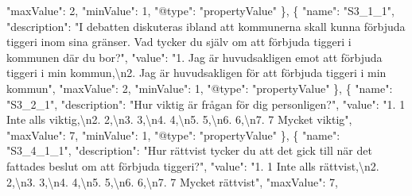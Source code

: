 \documentclass[
]{book}
\newenvironment{Shaded}{\begin{snugshade}}{\end{snugshade}}
\newcommand{\CharTok}[1]{\textcolor[rgb]{0.31,0.60,0.02}{#1}}
\newcommand{\DataTypeTok}[1]{\textcolor[rgb]{0.13,0.29,0.53}{#1}}
\newcommand{\DecValTok}[1]{\textcolor[rgb]{0.00,0.00,0.81}{#1}}
\newcommand{\FunctionTok}[1]{\textcolor[rgb]{0.00,0.00,0.00}{#1}}
\newcommand{\OtherTok}[1]{\textcolor[rgb]{0.56,0.35,0.01}{#1}}
\newcommand{\StringTok}[1]{\textcolor[rgb]{0.31,0.60,0.02}{#1}}
\begin{document}
\begin{Shaded}
\begin{Highlighting}[]
      \DataTypeTok{"maxValue"}\FunctionTok{:} \DecValTok{2}\FunctionTok{,}
      \DataTypeTok{"minValue"}\FunctionTok{:} \DecValTok{1}\FunctionTok{,}
      \DataTypeTok{"@type"}\FunctionTok{:} \StringTok{"propertyValue"}
    \FunctionTok{\}}\OtherTok{,}
    \FunctionTok{\{}
      \DataTypeTok{"name"}\FunctionTok{:} \StringTok{"S3_1_1"}\FunctionTok{,}
      \DataTypeTok{"description"}\FunctionTok{:} \StringTok{"I debatten diskuteras ibland att kommunerna skall kunna förbjuda tiggeri inom sina gränser. Vad tycker du själv om att förbjuda tiggeri i kommunen där du bor?"}\FunctionTok{,}
      \DataTypeTok{"value"}\FunctionTok{:} \StringTok{"1. Jag är huvudsakligen emot att förbjuda tiggeri i min kommun,}\CharTok{\textbackslash{}n}\StringTok{2. Jag är huvudsakligen för att förbjuda tiggeri i min kommun"}\FunctionTok{,}
      \DataTypeTok{"maxValue"}\FunctionTok{:} \DecValTok{2}\FunctionTok{,}
      \DataTypeTok{"minValue"}\FunctionTok{:} \DecValTok{1}\FunctionTok{,}
      \DataTypeTok{"@type"}\FunctionTok{:} \StringTok{"propertyValue"}
    \FunctionTok{\}}\OtherTok{,}
    \FunctionTok{\{}
      \DataTypeTok{"name"}\FunctionTok{:} \StringTok{"S3_2_1"}\FunctionTok{,}
      \DataTypeTok{"description"}\FunctionTok{:} \StringTok{"Hur viktig är frågan för dig personligen?"}\FunctionTok{,}
      \DataTypeTok{"value"}\FunctionTok{:} \StringTok{"1. 1 Inte alls viktig,}\CharTok{\textbackslash{}n}\StringTok{2. 2,}\CharTok{\textbackslash{}n}\StringTok{3. 3,}\CharTok{\textbackslash{}n}\StringTok{4. 4,}\CharTok{\textbackslash{}n}\StringTok{5. 5,}\CharTok{\textbackslash{}n}\StringTok{6. 6,}\CharTok{\textbackslash{}n}\StringTok{7. 7 Mycket viktig"}\FunctionTok{,}
      \DataTypeTok{"maxValue"}\FunctionTok{:} \DecValTok{7}\FunctionTok{,}
      \DataTypeTok{"minValue"}\FunctionTok{:} \DecValTok{1}\FunctionTok{,}
      \DataTypeTok{"@type"}\FunctionTok{:} \StringTok{"propertyValue"}
    \FunctionTok{\}}\OtherTok{,}
    \FunctionTok{\{}
      \DataTypeTok{"name"}\FunctionTok{:} \StringTok{"S3_4_1_1"}\FunctionTok{,}
      \DataTypeTok{"description"}\FunctionTok{:} \StringTok{"Hur rättvist tycker du att det gick till när det fattades beslut om att förbjuda tiggeri?"}\FunctionTok{,}
      \DataTypeTok{"value"}\FunctionTok{:} \StringTok{"1. 1 Inte alls rättvist,}\CharTok{\textbackslash{}n}\StringTok{2. 2,}\CharTok{\textbackslash{}n}\StringTok{3. 3,}\CharTok{\textbackslash{}n}\StringTok{4. 4,}\CharTok{\textbackslash{}n}\StringTok{5. 5,}\CharTok{\textbackslash{}n}\StringTok{6. 6,}\CharTok{\textbackslash{}n}\StringTok{7. 7 Mycket rättvist"}\FunctionTok{,}
      \DataTypeTok{"maxValue"}\FunctionTok{:} \DecValTok{7}\FunctionTok{,}

\end{Highlighting}
\end{Shaded}
\end{document}
